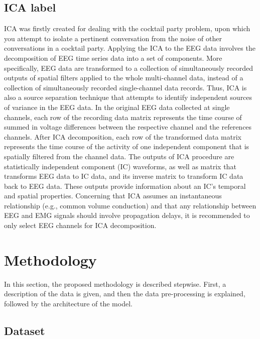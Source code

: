 \documentclass[12pt,a4paper,titlepage,openany]{report}
\begin{document}
\section{ICA label}

ICA was ﬁrstly created for dealing with the cocktail party problem, upon which you attempt to isolate a pertinent conversation from the noise of other conversations in a cocktail party. Applying the ICA to the EEG data involves the decomposition of EEG time series data into a set of components. More speciﬁcally, EEG data are transformed to a collection of simultaneously recorded outputs of spatial ﬁlters applied to the whole multi-channel data, instead of a collection of simultaneously recorded single-channel data records. Thus, ICA is also a source separation technique that attempts to identify independent sources of variance in the EEG data. 
In the original EEG data collected at single channels, each row of the recording data matrix represents the time course of summed in voltage differences between the respective channel and the references channels. 
After ICA decomposition, each row of the transformed data matrix represents the time course of the activity of one independent component that is spatially ﬁltered from the channel data. 
The outputs of ICA procedure are statistically independent component (IC) waveforms, as well as matrix that transforms EEG data to IC data, and its inverse matrix to transform IC data back to EEG data. 
These outputs provide information about an IC’s temporal and spatial properties. Concerning that ICA assumes an instantaneous relationship (e.g., common volume conduction) and that any relationship between EEG and EMG signals should involve propagation delays, it is recommended to only select EEG channels for ICA decomposition.\cite{makkar2023}



\chapter{Methodology}
\thispagestyle{fancy}

In this section, the proposed methodology is described stepwise. First, a description of the data is given, and then the data pre-processing is explained, followed by the architecture of the model.

\section{Dataset}
\end{document}
